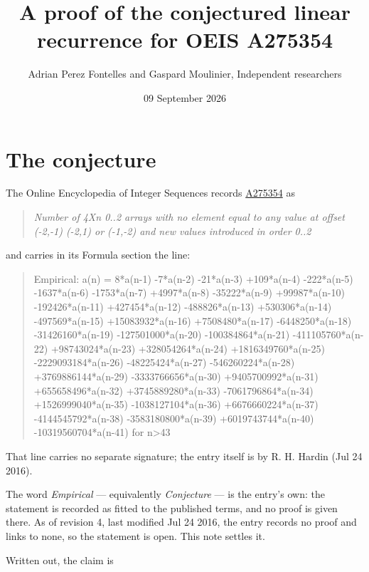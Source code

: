 \documentclass[11pt]{article}
\title{A proof of the conjectured linear recurrence for OEIS A275354}
\author{Adrian Perez Fontelles and Gaspard Moulinier, Independent researchers}
\date{09 September 2026}
\theoremstyle{definition}
\begin{document}
\maketitle
\section{The conjecture}

The Online Encyclopedia of Integer Sequences records \href{https://oeis.org/A275354}{A275354} as

\begin{quote}\itshape Number of 4Xn 0..2 arrays with no element equal to any value at offset (-2,-1) (-2,1) or (-1,-2) and new values introduced in order 0..2\end{quote}

and carries in its Formula section the line:

\begin{quote}\ttfamily Empirical: a(n) = 8*a(n-1) -7*a(n-2) -21*a(n-3) +109*a(n-4) -222*a(n-5) -1637*a(n-6) -1753*a(n-7) +4997*a(n-8) -35222*a(n-9) +99987*a(n-10) -192426*a(n-11) +427454*a(n-12) -488826*a(n-13) +530306*a(n-14) -497569*a(n-15) +15083932*a(n-16) +7508480*a(n-17) -6448250*a(n-18) -31426160*a(n-19) -127501000*a(n-20) -100384864*a(n-21) -411105760*a(n-22) +98743024*a(n-23) +328054264*a(n-24) +1816349760*a(n-25) -2229093184*a(n-26) -48225424*a(n-27) -546260224*a(n-28) +3769886144*a(n-29) -3333766656*a(n-30) +9405700992*a(n-31) +655658496*a(n-32) +3745889280*a(n-33) -7061796864*a(n-34) +1526999040*a(n-35) -1038127104*a(n-36) +6676660224*a(n-37) -4144545792*a(n-38) -3583180800*a(n-39) +6019743744*a(n-40) -10319560704*a(n-41) for n>43\end{quote}

That line carries no separate signature; the entry itself is by R. H. Hardin (Jul 24 2016).

The word {\itshape Empirical} --- equivalently {\itshape Conjecture} --- is the entry's own: the statement is recorded as fitted to the published terms, and no proof is given there. As of revision 4, last modified Jul 24 2016, the entry records no proof and links to none, so the statement is open. This note settles it.

Written out, the claim is
\end{document}

